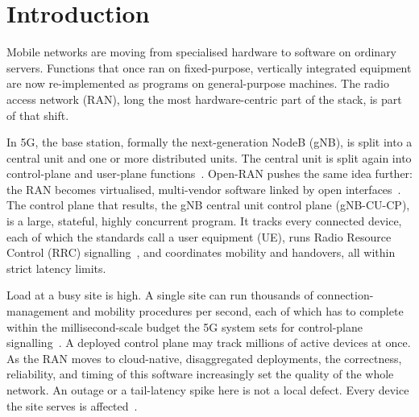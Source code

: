 \documentclass[english,twoside,openright,a4paper,censored,csm,software-track-2020]{HYthesisML}
\begin{document}
\cleardoublepage
\mainmatter


\chapter{Introduction}

Mobile networks are moving from specialised hardware to software on ordinary servers.
Functions that once ran on fixed-purpose, vertically integrated equipment are now
re-implemented as programs on general-purpose machines. The radio access network (RAN),
long the most hardware-centric part of the stack, is part of that shift.

In 5G, the base station, formally the next-generation NodeB (gNB), is split into a central
unit and one or more distributed units. The central unit is split again into control-plane
and user-plane functions~\cite{3gpp38401,3gpp38300}. Open-RAN pushes the same idea further:
the RAN becomes virtualised, multi-vendor software linked by open
interfaces~\cite{polese2023oran}. The control plane that results, the gNB central unit
control plane (gNB-CU-CP), is a large, stateful, highly concurrent program. It tracks every
connected device, each of which the standards call a user equipment (UE), runs Radio Resource
Control (RRC) signalling~\cite{3gpp38331}, and coordinates mobility and handovers, all within
strict latency limits.


Load at a busy site is high. A single site can run thousands of connection-management and
mobility procedures per second, each of which has to complete within the millisecond-scale
budget the 5G system sets for control-plane signalling~\cite{3gpp38913}. A deployed control plane may track millions of active
devices at once. As the RAN moves to cloud-native, disaggregated deployments, the
correctness, reliability, and timing of this software increasingly set the quality of the
whole network. An outage or a tail-latency spike here is not a local defect. Every device
the site serves is affected~\cite{dean2013tail,barroso2017microseconds}.
\end{document}
